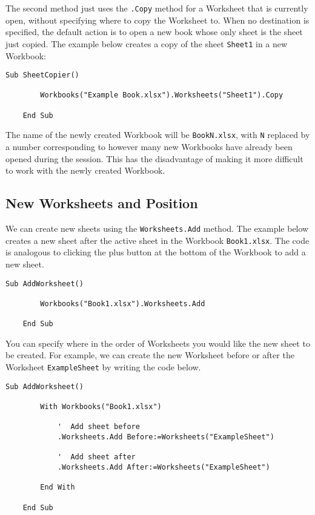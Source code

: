\documentclass[11pt]{article}%
\begin{document}
The second method just uses the \texttt{.Copy} method for a Worksheet that is currently open, without specifying where to copy the Worksheet to. When no destination is specified, the default action is to open a new book whose only sheet is the sheet just copied. The example below creates a copy of the sheet \texttt{Sheet1} in a new Workbook:\\

\begin{lstlisting}[style=A]
    Sub SheetCopier()

        Workbooks("Example Book.xlsx").Worksheets("Sheet1").Copy

    End Sub
\end{lstlisting}

The name of the newly created Workbook will be \texttt{BookN.xlsx}, with \texttt{N} replaced by a number corresponding to however many new Workbooks have already been opened during the session. This has the disadvantage of making it more difficult to work with the newly created Workbook.


\subsection{New Worksheets and Position}

We can create new sheets using the \texttt{Worksheets.Add} method. The example below creates a new sheet after the active sheet in the Workbook \texttt{Book1.xlsx}. The code is analogous to clicking the plus button at the bottom of the Workbook to add a new sheet.\\

\begin{lstlisting}[style=A]
    Sub AddWorksheet()

        Workbooks("Book1.xlsx").Worksheets.Add

    End Sub
\end{lstlisting}

You can specify where in the order of Worksheets you would like the new sheet to be created. For example, we can create the new Worksheet before or after the Worksheet \texttt{ExampleSheet} by writing the code below.\\

\begin{lstlisting}[style=A]
    Sub AddWorksheet()

        With Workbooks("Book1.xlsx")

            '  Add sheet before
            .Worksheets.Add Before:=Worksheets("ExampleSheet")

            '  Add sheet after
            .Worksheets.Add After:=Worksheets("ExampleSheet")

        End With

    End Sub
\end{lstlisting}
\end{document}
